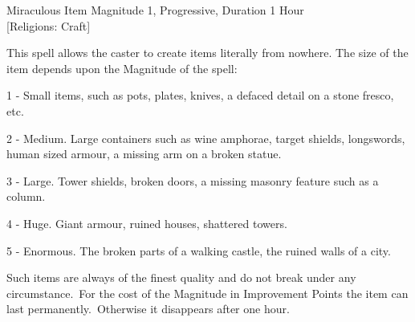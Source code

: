 \begin{rpg-spell}
{Miraculous Item}
{Magnitude 1, Progressive, Duration 1 Hour\\{[Religions: Craft]}}

This spell allows the caster to create items literally from nowhere. The size of the item depends upon the Magnitude of the spell:
\begin{rpg-list}
\item 1 - Small items, such as pots, plates, knives, a defaced detail on a stone fresco, etc.
\item 2 - Medium. Large containers such as wine amphorae, target shields, longswords, human sized armour, a missing arm on a broken statue.
\item 3 - Large. Tower shields, broken doors, a missing masonry feature such as a column.
\item 4 - Huge. Giant armour, ruined houses, shattered towers.
\item 5 - Enormous. The broken parts of a walking castle, the ruined walls of a city.
\end{rpg-list}
Such items are always of the finest quality and do not break under any circumstance. For the cost of the Magnitude in Improvement Points the item can last permanently. Otherwise it disappears after one hour.
\end{rpg-spell}


